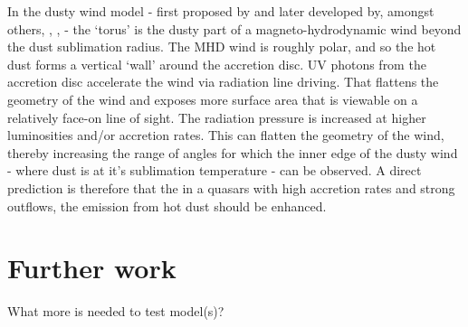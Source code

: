 In the dusty wind model - first proposed by \citet{konigl94} and later developed by, amongst others, \citet{everett05}, \citet{elitzur06}, \citet{keating12} - the `torus' is the dusty part of a magneto-hydrodynamic wind beyond the dust sublimation radius. 
The MHD wind is roughly polar, and so the hot dust forms a vertical `wall' around the accretion disc.  
UV photons from the accretion disc accelerate the wind via radiation line driving. 
That flattens the geometry of the wind and exposes more surface area that is viewable on a relatively face-on line of sight.  
The radiation pressure is increased at higher luminosities and/or accretion rates.
This can flatten the geometry of the wind, thereby increasing the range of angles for which the inner edge of the dusty wind - where dust is at it's sublimation temperature - can be observed. 
A direct prediction is therefore that the in a quasars with high accretion rates and strong outflows, the emission from hot dust should be enhanced. 


\section{Further work}

What more is needed to test model(s)?  